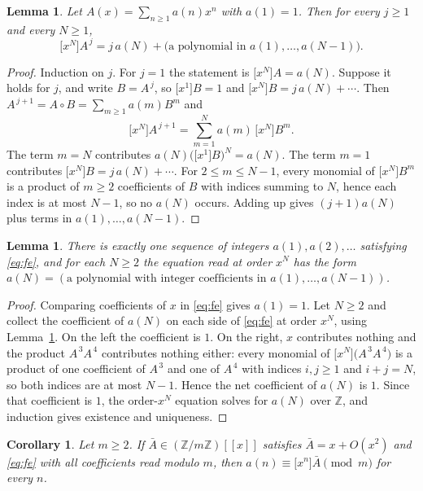 \documentclass[11pt,a4paper]{article}
\theoremstyle{plain}
\newtheorem{lemma}[theorem]{Lemma}
\newtheorem{corollary}[theorem]{Corollary}
\theoremstyle{definition}
\begin{document}
\begin{lemma}\label{lem:jaN}
Let $A(x)=\sum_{n\ge1}a(n)x^{n}$ with $a(1)=1$. Then for every $j\ge1$ and every
$N\ge1$,
\[
\bigl[x^{N}\bigr]A^{\,j}=j\,a(N)+\bigl(\text{a polynomial in }a(1),\dots,a(N-1)\bigr).
\]
\end{lemma}

\begin{proof}
Induction on $j$. For $j=1$ the statement is $\bigl[x^{N}\bigr]A=a(N)$. Suppose it holds
for $j$, and write $B=A^{\,j}$, so $\bigl[x^{1}\bigr]B=1$ and
$\bigl[x^{N}\bigr]B=j\,a(N)+\cdots$. Then $A^{\,j+1}=A\circ B=\sum_{m\ge1}a(m)B^{m}$
and
\[
\bigl[x^{N}\bigr]A^{\,j+1}=\sum_{m=1}^{N}a(m)\,\bigl[x^{N}\bigr]B^{m} .
\]
The term $m=N$ contributes $a(N)\bigl(\bigl[x^{1}\bigr]B\bigr)^{N}=a(N)$. The term $m=1$
contributes $\bigl[x^{N}\bigr]B=j\,a(N)+\cdots$. For $2\le m\le N-1$, every monomial of
$\bigl[x^{N}\bigr]B^{m}$ is a product of $m\ge2$ coefficients of $B$ with indices summing
to $N$, hence each index is at most $N-1$, so no $a(N)$ occurs. Adding up gives
$(j+1)a(N)$ plus terms in $a(1),\dots,a(N-1)$.
\end{proof}

\begin{lemma}\label{lem:unique}
There is exactly one sequence of integers $a(1),a(2),\dots$ satisfying \eqref{eq:fe}, and
for each $N\ge2$ the equation read at order $x^{N}$ has the form
$a(N)=(\text{a polynomial with integer coefficients in }a(1),\dots,a(N-1))$.
\end{lemma}

\begin{proof}
Comparing coefficients of $x$ in \eqref{eq:fe} gives $a(1)=1$. Let $N\ge2$ and collect the
coefficient of $a(N)$ on each side of \eqref{eq:fe} at order $x^{N}$, using
Lemma~\ref{lem:jaN}. On the left the coefficient is $1$. On the right, $x$ contributes nothing and the product $A^{\,3}A^{\,4}$ contributes nothing either: every monomial of $\bigl[x^{N}\bigr]\bigl(A^{\,3}A^{\,4}\bigr)$ is a product of one coefficient of $A^{\,3}$ and one of $A^{\,4}$ with indices $i,j\ge1$ and $i+j=N$, so both indices are at most $N-1$. Hence the net coefficient of $a(N)$ is $1$.
Since that coefficient is $1$, the order-$x^{N}$ equation solves for $a(N)$ over
$\mathbb{Z}$, and induction gives existence and uniqueness.
\end{proof}

\begin{corollary}\label{cor:mod}
Let $m\ge2$. If $\bar A\in(\mathbb{Z}/m\mathbb{Z})[[x]]$ satisfies $\bar A=x+O(x^{2})$ and
\eqref{eq:fe} with all coefficients read modulo $m$, then
$a(n)\equiv\bigl[x^{n}\bigr]\bar A\pmod m$ for every $n$.
\end{corollary}
\end{document}
